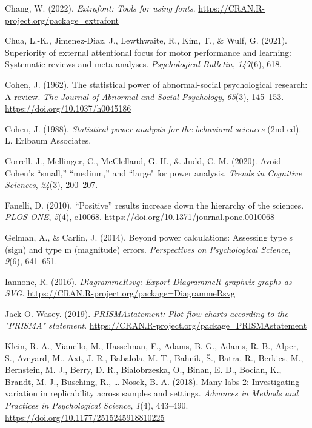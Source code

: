\documentclass[
  man, donotrepeattitle,mask,floatsintext]{apa7}
\newlength{\cslhangindent}
\newlength{\cslentryspacingunit} %
\newenvironment{CSLReferences}[2] %
 {%
  \setlength{\parindent}{0pt}
  \ifodd #1
  \let\oldpar\par
  \def\par{\hangindent=\cslhangindent\oldpar}
  \fi
  \setlength{\parskip}{#2\cslentryspacingunit}
 }%
 {}
\begin{document}
\begin{CSLReferences}{1}{0}
\leavevmode{}%
Chang, W. (2022). \emph{Extrafont: Tools for using fonts}. \url{https://CRAN.R-project.org/package=extrafont}

\leavevmode{}%
Chua, L.-K., Jimenez-Diaz, J., Lewthwaite, R., Kim, T., \& Wulf, G. (2021). Superiority of external attentional focus for motor performance and learning: Systematic reviews and meta-analyses. \emph{Psychological Bulletin}, \emph{147}(6), 618.

\leavevmode{}%
Cohen, J. (1962). The statistical power of abnormal-social psychological research: A review. \emph{The Journal of Abnormal and Social Psychology}, \emph{65}(3), 145--153. \url{https://doi.org/10.1037/h0045186}

\leavevmode{}%
Cohen, J. (1988). \emph{Statistical power analysis for the behavioral sciences} (2nd ed). L. Erlbaum Associates.

\leavevmode{}%
Correll, J., Mellinger, C., McClelland, G. H., \& Judd, C. M. (2020). Avoid {C}ohen's {``small,''} {``medium,''} and ``large" for power analysis. \emph{Trends in Cognitive Sciences}, \emph{24}(3), 200--207.

\leavevmode{}%
Fanelli, D. (2010). {``Positive''} results increase down the hierarchy of the sciences. \emph{PLOS ONE}, \emph{5}(4), e10068. \url{https://doi.org/10.1371/journal.pone.0010068}

\leavevmode{}%
Gelman, A., \& Carlin, J. (2014). Beyond power calculations: Assessing type s (sign) and type m (magnitude) errors. \emph{Perspectives on Psychological Science}, \emph{9}(6), 641--651.

\leavevmode{}%
Iannone, R. (2016). \emph{DiagrammeRsvg: Export DiagrammeR graphviz graphs as SVG}. \url{https://CRAN.R-project.org/package=DiagrammeRsvg}

\leavevmode{}%
Jack O. Wasey. (2019). \emph{PRISMAstatement: Plot flow charts according to the "PRISMA" statement}. \url{https://CRAN.R-project.org/package=PRISMAstatement}

\leavevmode{}%
Klein, R. A., Vianello, M., Hasselman, F., Adams, B. G., Adams, R. B., Alper, S., Aveyard, M., Axt, J. R., Babalola, M. T., Bahník, Š., Batra, R., Berkics, M., Bernstein, M. J., Berry, D. R., Bialobrzeska, O., Binan, E. D., Bocian, K., Brandt, M. J., Busching, R., \ldots{} Nosek, B. A. (2018). Many labs 2: Investigating variation in replicability across samples and settings. \emph{Advances in Methods and Practices in Psychological Science}, \emph{1}(4), 443--490. \url{https://doi.org/10.1177/2515245918810225}


\end{CSLReferences}
\end{document}
